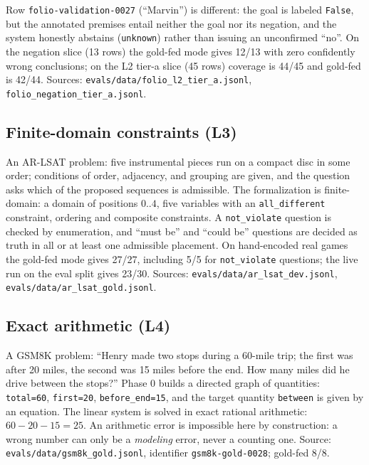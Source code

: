 \documentclass[11pt,a4paper]{article}
\begin{document}
Row \texttt{folio-validation-0027} (``Marvin'') is different: the goal is labeled
\texttt{False}, but the annotated premises entail neither the goal nor its negation, and the
system honestly abstains (\texttt{unknown}) rather than issuing an unconfirmed ``no''. On
the negation slice (13 rows) the gold-fed mode gives 12/13 with zero confidently wrong
conclusions; on the L2 tier-a slice (45 rows) coverage is 44/45 and gold-fed is 42/44.
Sources: \texttt{evals/data/folio\_l2\_tier\_a.jsonl},
\texttt{folio\_negation\_tier\_a.jsonl}.

\subsection{Finite-domain constraints (L3)}

An AR-LSAT problem: five instrumental pieces run on a compact disc in some order; conditions
of order, adjacency, and grouping are given, and the question asks which of the proposed
sequences is admissible. The formalization is finite-domain: a domain of positions $0..4$,
five variables with an \texttt{all\_different} constraint, ordering and composite
constraints. A \texttt{not\_violate} question is checked by enumeration, and ``must be'' and
``could be'' questions are decided as truth in all or at least one admissible placement. On
hand-encoded real games the gold-fed mode gives 27/27, including 5/5 for
\texttt{not\_violate} questions; the live run on the eval split gives 23/30. Sources:
\texttt{evals/data/ar\_lsat\_dev.jsonl}, \texttt{evals/data/ar\_lsat\_gold.jsonl}.

\subsection{Exact arithmetic (L4)}

A GSM8K problem: ``Henry made two stops during a 60-mile trip; the first was after 20 miles,
the second was 15 miles before the end. How many miles did he drive between the stops?''
Phase 0 builds a directed graph of quantities: \texttt{total=60}, \texttt{first=20},
\texttt{before\_end=15}, and the target quantity \texttt{between} is given by an equation.
The linear system is solved in exact rational arithmetic: $60-20-15=25$. An arithmetic error
is impossible here by construction: a wrong number can only be a \emph{modeling} error,
never a counting one. Source: \texttt{evals/data/gsm8k\_gold.jsonl}, identifier
\texttt{gsm8k-gold-0028}; gold-fed 8/8.

\end{document}
